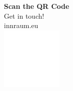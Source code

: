 \documentclass[aspectratio=169, notes]{beamer}
\begin{document}
{

    \begin{frame}
        \color{white} %
        \centering
        {\huge \textbf{Scan the QR Code}}\\[0.5cm]
        {\Large Get in touch!}\\[0.5cm]
        {\Large innraum.eu}\\[1.0cm]
        \includegraphics[width=3cm]{Logos/qr_code_innraum_eu.png}
    \end{frame}

}
\end{document}
